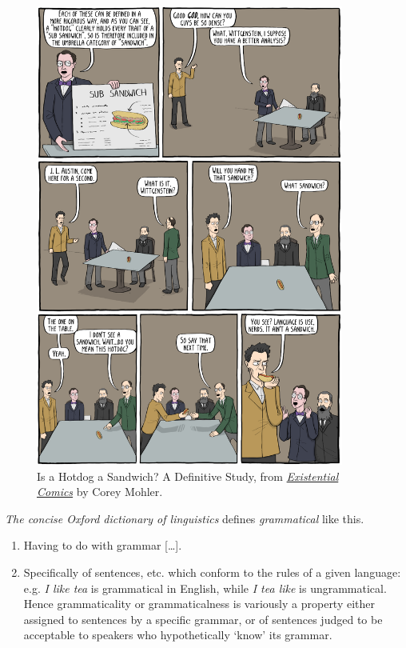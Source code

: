 \begin{figure}
\centering
\includegraphics[width=0.90\textwidth]{figures/hotdogSandwich2.png}
\caption{Is a Hotdog a Sandwich? A Definitive Study, from \textit{\href{https://existentialcomics.com/}{Existential Comics}} by Corey Mohler.}
\label{fig:comic}
\end{figure}

\textit{The concise Oxford dictionary of linguistics} \citep{Matthews2003} defines \textit{grammatical} like this.


\begin{enumerate}[noitemsep]
    \item Having to do with grammar [\dots].
    \item Specifically of sentences, etc. which conform to the rules of a given language: e.g. \textit{I like tea }is grammatical in English, while \textit{I tea like} is ungrammatical. Hence grammaticality or grammaticalness is variously a property either assigned to sentences by a specific grammar, or of sentences judged to be acceptable to speakers who hypothetically `know' its grammar.
\end{enumerate}

